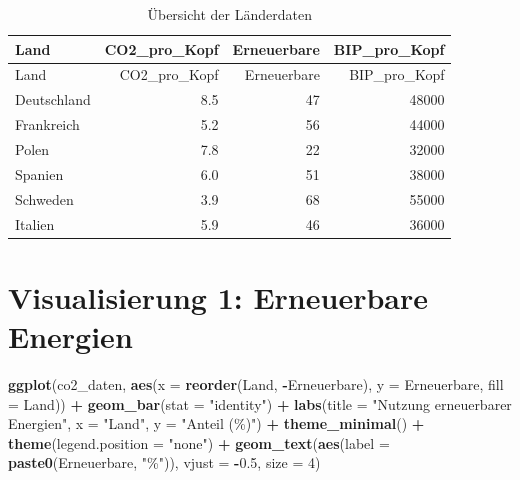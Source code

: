 \documentclass[
]{article}
\newenvironment{Shaded}{\begin{snugshade}}{\end{snugshade}}
\newcommand{\AttributeTok}[1]{\textcolor[rgb]{0.13,0.29,0.53}{#1}}
\newcommand{\DecValTok}[1]{\textcolor[rgb]{0.00,0.00,0.81}{#1}}
\newcommand{\FloatTok}[1]{\textcolor[rgb]{0.00,0.00,0.81}{#1}}
\newcommand{\FunctionTok}[1]{\textcolor[rgb]{0.13,0.29,0.53}{\textbf{#1}}}
\newcommand{\NormalTok}[1]{#1}
\newcommand{\SpecialCharTok}[1]{\textcolor[rgb]{0.81,0.36,0.00}{\textbf{#1}}}
\newcommand{\StringTok}[1]{\textcolor[rgb]{0.31,0.60,0.02}{#1}}
\newcounter{none} %
\begin{document}
\begin{longtable}[]{@{}lrrr@{}}
\caption{Übersicht der Länderdaten}\tabularnewline
\toprule\noalign{}
Land & CO2\_pro\_Kopf & Erneuerbare & BIP\_pro\_Kopf \\
\midrule\noalign{}
\endfirsthead
\toprule\noalign{}
Land & CO2\_pro\_Kopf & Erneuerbare & BIP\_pro\_Kopf \\
\midrule\noalign{}
\endhead
\bottomrule\noalign{}
\endlastfoot
Deutschland & 8.5 & 47 & 48000 \\
Frankreich & 5.2 & 56 & 44000 \\
Polen & 7.8 & 22 & 32000 \\
Spanien & 6.0 & 51 & 38000 \\
Schweden & 3.9 & 68 & 55000 \\
Italien & 5.9 & 46 & 36000 \\
\end{longtable}

\section{Visualisierung 1: Erneuerbare
Energien}\label{visualisierung-1-erneuerbare-energien}

\begin{Shaded}
\begin{Highlighting}[]
  \FunctionTok{ggplot}\NormalTok{(co2\_daten, }\FunctionTok{aes}\NormalTok{(}\AttributeTok{x =} \FunctionTok{reorder}\NormalTok{(Land, }\SpecialCharTok{{-}}\NormalTok{Erneuerbare), }\AttributeTok{y =}\NormalTok{ Erneuerbare, }\AttributeTok{fill =}\NormalTok{ Land)) }\SpecialCharTok{+}
  \FunctionTok{geom\_bar}\NormalTok{(}\AttributeTok{stat =} \StringTok{"identity"}\NormalTok{) }\SpecialCharTok{+}
  \FunctionTok{labs}\NormalTok{(}\AttributeTok{title =} \StringTok{"Nutzung erneuerbarer Energien"}\NormalTok{, }
       \AttributeTok{x =} \StringTok{"Land"}\NormalTok{, }\AttributeTok{y =} \StringTok{"Anteil (\%)"}\NormalTok{) }\SpecialCharTok{+}
  \FunctionTok{theme\_minimal}\NormalTok{() }\SpecialCharTok{+}
  \FunctionTok{theme}\NormalTok{(}\AttributeTok{legend.position =} \StringTok{"none"}\NormalTok{) }\SpecialCharTok{+}
  \FunctionTok{geom\_text}\NormalTok{(}\FunctionTok{aes}\NormalTok{(}\AttributeTok{label =} \FunctionTok{paste0}\NormalTok{(Erneuerbare, }\StringTok{"\%"}\NormalTok{)), }\AttributeTok{vjust =} \SpecialCharTok{{-}}\FloatTok{0.5}\NormalTok{, }\AttributeTok{size =} \DecValTok{4}\NormalTok{)}
\end{Highlighting}
\end{Shaded}
\end{document}
